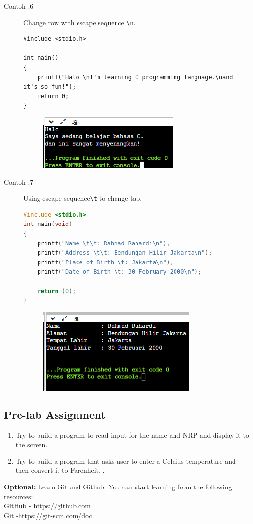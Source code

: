 \begin{description}
	\item[Contoh \thesubsection.6] Change row with escape sequence \verb*|\n|.
		\begin{lstlisting}
#include <stdio.h>

int main() 
{
	printf("Halo \nI'm learning C programming language.\nand it's so fun!");
	return 0;
}
	\end{lstlisting}
		\begin{figure}[H]
			\centering
			\includegraphics[width=0.5\linewidth]{P1/img/screenshot0006.png}
			\caption{}
			\label{fig:screenshot0006}
		\end{figure}

	\item[Contoh \thesubsection.7] Using escape sequence\verb*|\t| to change tab.
		\begin{lstlisting}[language=c]
#include <stdio.h>
int main(void)
{
	printf("Name \t\t: Rahmad Rahardi\n");
	printf("Address \t\t: Bendungan Hilir Jakarta\n");
	printf("Place of Birth \t: Jakarta\n");
	printf("Date of Birth \t: 30 February 2000\n");
	
	return (0);
}
\end{lstlisting}
		\begin{figure}[H]
			\centering
			\includegraphics[width=0.5\linewidth]{P1/img/screenshot0007.png}
			\caption{}
			\label{fig:screenshot0007}
		\end{figure}
\end{description}

\subsection{Pre-lab Assignment}
\begin{enumerate}
	\item Try to build a program to read input for the name and NRP and display it to the screen.
	\item Try to build a program that asks user to enter a Celcius temperature and then convert it to Farenheit.  .
\end{enumerate}

\begin{center}
	\colorbox{cyan!30}{\parbox{0.8\linewidth}{\textbf{Optional:} Learn Git and Github. You can start learning from the following resources: \\ \href{https://github.com}{GitHub - https://github.com} \\ \href{https://git-scm.com/doc}{Git -https://git-scm.com/doc}}}
\end{center}